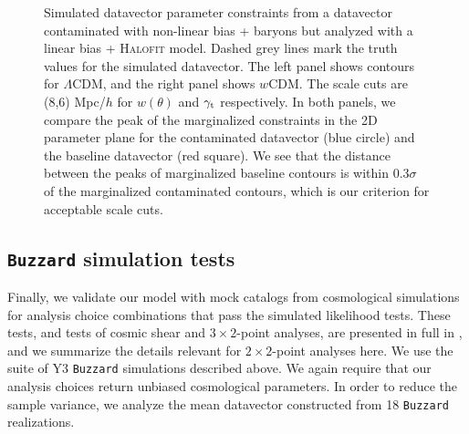 \documentclass[aps, prd,twocolumn,superscriptaddress,nofootinbib,preprintnumbers]{revtex4-1}
\newcommand{\lcdm}{$\Lambda$CDM}
\newcommand{\wcdm}{$w$CDM}
\newcommand{\mice}{\texttt{MICE} }
\newcommand{\buzzard}{\texttt{Buzzard} }
\newcommand{\blue}[1]{\textcolor{blue}{#1}}
\begin{document}
\begin{figure}
\centering
{}
\hfill
{}
    \caption[]{Simulated datavector parameter constraints from a datavector contaminated with non-linear bias + baryons but analyzed with a linear bias + \textsc{Halofit} model. Dashed grey lines mark the truth values for the simulated datavector. The left panel shows contours for \lcdm, and the right panel shows \wcdm. The scale cuts are (8,6) Mpc/$h$ for $w(\theta)$ and $\gamma_{\rm t}$ respectively. In both panels, we compare the peak of the marginalized constraints in the 2D  parameter plane for the contaminated datavector (blue circle) and the baseline datavector  (red square). We see that the distance between the peaks of marginalized baseline contours is within 0.3$\sigma$ of the marginalized contaminated contours, which is our criterion for acceptable scale cuts. }
\label{fig:sim_lin}    
\end{figure}



\subsection{\buzzard simulation tests}
\label{sec:sims}
Finally, we validate our model with mock catalogs from cosmological simulations for analysis choice combinations that pass the simulated likelihood tests. These tests, and tests of cosmic shear and $3\times2$-point analyses, are presented in full in \citet*{y3-simvalidation}, and we summarize the details relevant for $2\times2$-point analyses here. We use the suite of Y3 \buzzard simulations described above. We again require that our analysis choices return unbiased cosmological parameters. In order to reduce the sample variance, we analyze the mean datavector constructed from 18 \buzzard realizations. 
\end{document}

